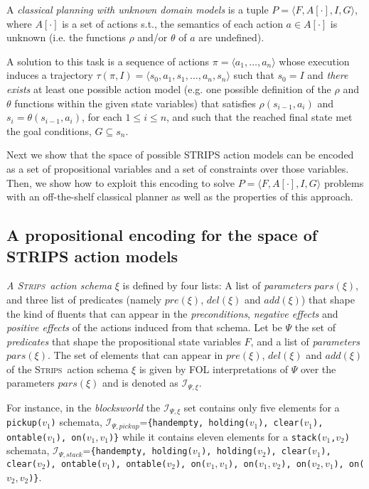 \documentclass{article}
\newcommand{\tup}[1]{{\langle #1 \rangle}}
\newcommand{\strips}{\textsc{Strips}}
\begin{document}
A {\em classical planning with unknown domain models} is a tuple $P=\tup{F,A[\cdot],I,G}$, where $A[\cdot]$ is a set of actions s.t., the semantics of each action $a\in A[\cdot]$ is unknown (i.e. the functions $\rho$ and/or $\theta$ of $a$ are undefined). 

A solution to this task is a sequence of actions $\pi=\tup{a_1, \ldots, a_n}$ whose execution induces a trajectory $\tau(\pi,I)=\tup{s_0, a_1, s_1, \ldots, a_n, s_n}$ such that $s_0=I$ and {\em there exists} at least one possible action model (e.g. one possible definition of the $\rho$ and $\theta$ functions within the given state variables) that satisfies $\rho(s_{i-1},a_i)$ and $s_i=\theta(s_{i-1},a_i)$, for each {\small $1\leq i\leq n$}, and such that the reached final state met the goal conditions, $G \subseteq s_n$. 

Next we show that the space of possible STRIPS action models can be encoded as a set of propositional variables and a set of constraints over those variables. Then, we show how to exploit this encoding to solve $P=\tup{F,A[\cdot],I,G}$ problems with an off-the-shelf classical planner as well as the properties of this approach.


\subsection{A propositional encoding for the space of STRIPS action models}
{\em A \strips\ action schema} $\xi$ is defined by four lists: A list of {\em parameters} $pars(\xi)$, and three list of predicates (namely $pre(\xi)$, $del(\xi)$ and $add(\xi)$) that shape the kind of fluents that can appear in the {\em preconditions}, {\em negative effects} and {\em positive effects} of the actions induced from that schema. Let be $\Psi$ the set of {\em predicates} that shape the propositional state variables $F$, and a list of {\em parameters} $pars(\xi)$. The set of elements that can appear in $pre(\xi)$, $del(\xi)$ and $add(\xi)$ of the \strips\ action schema $\xi$ is given by FOL interpretations of $\Psi$ over the parameters $pars(\xi)$ and is denoted as ${\mathcal I}_{\Psi,\xi}$.

For instance, in the {\em blocksworld} the ${\mathcal I}_{\Psi,\xi}$ set contains only five elements for a {\small \tt pickup($v_1$)} schemata, ${\mathcal I}_{\Psi,pickup}$={\small\tt\{handempty, holding($v_1$), clear($v_1$), ontable($v_1$), on($v_1,v_1$)\}} while it contains eleven elements for a {\small \tt stack($v_1$,$v_2$)} schemata, ${\mathcal I}_{\Psi,stack}$={\small\tt\{handempty, holding($v_1$), holding($v_2$), clear($v_1$), clear($v_2$), ontable($v_1$), ontable($v_2$), on($v_1,v_1$), on($v_1,v_2$), on($v_2,v_1$), on($v_2,v_2$)\}}. 
\end{document}
